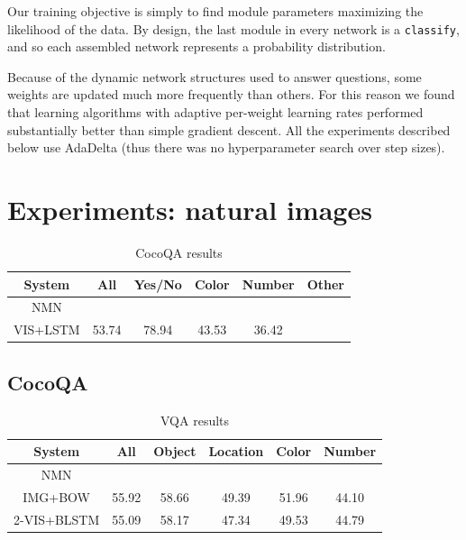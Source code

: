 \documentclass[10pt,twocolumn,letterpaper]{article}
\begin{document}
Our training objective is simply to find module parameters maximizing the likelihood of the data. By design, the last module in every network is a {\small\tt classify}, and so each assembled network represents a probability distribution.

Because of the dynamic network structures used to answer questions, some weights are updated much more frequently than others. For this reason we found that learning algorithms with adaptive per-weight learning rates performed substantially better than simple gradient descent. All the experiments described below use AdaDelta (thus there was no hyperparameter search over step sizes).


\section{Experiments: natural images}

\begin{table}[h]
  \footnotesize
  \center
  \begin{tabular}{cccccc}
    \toprule
    System & All & Yes/No & Color & Number & Other \\
    \midrule
    NMN \\
    VIS+LSTM & 53.74 & 78.94 & 43.53 & 36.42 & \\
    \bottomrule
  \end{tabular}
  \caption{CocoQA results}
\end{table}

\subsection{CocoQA}

\begin{table}[h]
  \footnotesize
  \center
  \begin{tabular}{cccccc}
    \toprule
    System & All & Object & Location & Color & Number \\
    \midrule
    NMN \\
    IMG+BOW & 55.92 & 58.66 & 49.39 & 51.96 & 44.10 \\
    2-VIS+BLSTM & 55.09 & 58.17 & 47.34 & 49.53 & 44.79 \\
    \bottomrule
  \end{tabular}
  \caption{VQA results}
\end{table}
\end{document}
